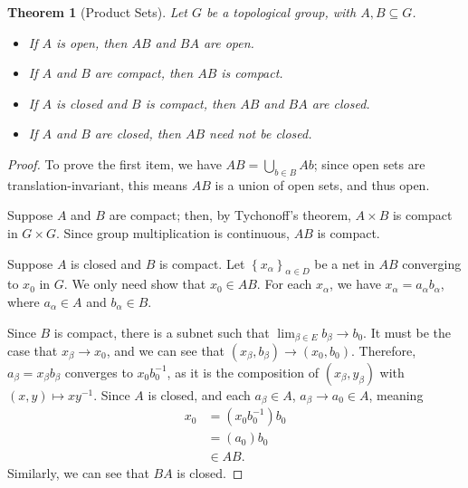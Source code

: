 \documentclass[12pt]{extarticle}
\newcommand{\set}[1]{\left\{#1\right\}}
\theoremstyle{plain}
\newtheorem*{theorem}{Theorem}
\theoremstyle{definition}
\theoremstyle{note}
\renewcommand{\newline}{\hfill\break}
\begin{document}
\begin{theorem}[Product Sets]
  Let $G$ be a topological group, with $A,B\subseteq G$.
  \begin{itemize}
    \item If $A$ is open, then $AB$ and $BA$ are open.
    \item If $A$ and $B$ are compact, then $AB$ is compact.
    \item If $A$ is closed and $B$ is compact, then $AB$ and $BA$ are closed.
    \item If $A$ and $B$ are closed, then $AB$ need not be closed.
  \end{itemize}
\end{theorem}
\begin{proof}
  To prove the first item, we have $AB = \bigcup_{b\in B}Ab$; since open sets are translation-invariant, this means $AB$ is a union of open sets, and thus open.\newline

  Suppose $A$ and $B$ are compact; then, by Tychonoff's theorem, $A\times B$ is compact in $G\times G$. Since group multiplication is continuous, $AB$ is compact.\newline

  Suppose $A$ is closed and $B$ is compact. Let $\set{x_{\alpha}}_{\alpha \in D}$ be a net in $AB$ converging to $x_0$ in $G$. We only need show that $x_0\in AB$. For each $x_{\alpha}$, we have $x_{\alpha} = a_{\alpha}b_{\alpha}$, where $a_{\alpha}\in A$ and $b_{\alpha}\in B$.\newline

  Since $B$ is compact, there is a subnet such that $\lim_{\beta \in E}b_{\beta}\rightarrow b_0$. It must be the case that $x_{\beta}\rightarrow x_0$, and we can see that $\left(x_{\beta},b_{\beta}\right)\rightarrow \left(x_0,b_0\right)$. Therefore, $a_{\beta} = x_{\beta}b_{\beta}$ converges to $x_0b_0^{-1}$, as it is the composition of $\left(x_{\beta},y_{\beta}\right)$ with $(x,y)\mapsto xy^{-1}$. Since $A$ is closed, and each $a_{\beta}\in A$, $a_{\beta}\rightarrow a_0\in A$, meaning
  \begin{align*}
    x_0 &= \left(x_0b_0^{-1}\right)b_0\\
        &= \left(a_0\right)b_0\\
        &\in AB.
  \end{align*}
  Similarly, we can see that $BA$ is closed.
\end{proof}
\end{document}
